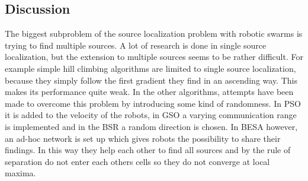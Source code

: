 \subsection{Discussion}
\begin{table}[H]
\renewcommand{\arraystretch}{1.3}
\label{table_alg_localization}
\centering
{}
  \caption{Overview of Common Source Localization Algorithms}
\end{table}
  The biggest subproblem of the source localization problem with robotic swarms is trying to find multiple sources.
  A lot of research is done in single source localization, but the extension to multiple sources seems to be rather difficult.
  For example simple hill climbing algorithms are limited to single source localization, because they simply follow the first gradient they find in an ascending way.
  This makes its performance quite weak.
  In the other algorithms, attempts have been made to overcome this problem by introducing some kind of randomness.
  In PSO it is added to the velocity of the robots, in GSO a varying communication range is implemented and in the BSR a random direction is chosen.
  In BESA however, an ad-hoc network is set up which gives robots the possibility to share their findings.
  In this way they help each other to find all sources and by the rule of separation do not enter each others cells so they do not converge at local maxima.\\

